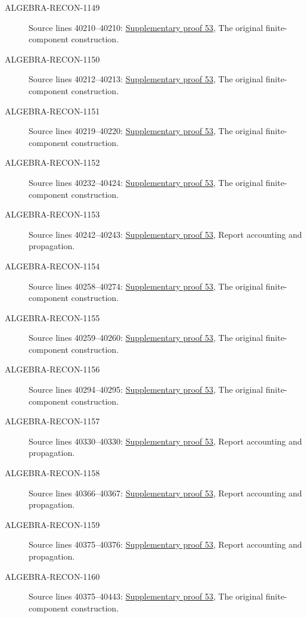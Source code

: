 \begin{description}
\item[ALGEBRA-RECON-1149] Source lines 40210--40210: \hyperlink{algebra_etale_quasifinite_notes_20260928}{Supplementary proof 53}, The original finite-component construction.
\item[ALGEBRA-RECON-1150] Source lines 40212--40213: \hyperlink{algebra_etale_quasifinite_notes_20260928}{Supplementary proof 53}, The original finite-component construction.
\item[ALGEBRA-RECON-1151] Source lines 40219--40220: \hyperlink{algebra_etale_quasifinite_notes_20260928}{Supplementary proof 53}, The original finite-component construction.
\item[ALGEBRA-RECON-1152] Source lines 40232--40424: \hyperlink{algebra_etale_quasifinite_notes_20260928}{Supplementary proof 53}, The original finite-component construction.
\item[ALGEBRA-RECON-1153] Source lines 40242--40243: \hyperlink{algebra_etale_quasifinite_notes_20260928}{Supplementary proof 53}, Report accounting and propagation.
\item[ALGEBRA-RECON-1154] Source lines 40258--40274: \hyperlink{algebra_etale_quasifinite_notes_20260928}{Supplementary proof 53}, The original finite-component construction.
\item[ALGEBRA-RECON-1155] Source lines 40259--40260: \hyperlink{algebra_etale_quasifinite_notes_20260928}{Supplementary proof 53}, The original finite-component construction.
\item[ALGEBRA-RECON-1156] Source lines 40294--40295: \hyperlink{algebra_etale_quasifinite_notes_20260928}{Supplementary proof 53}, The original finite-component construction.
\item[ALGEBRA-RECON-1157] Source lines 40330--40330: \hyperlink{algebra_etale_quasifinite_notes_20260928}{Supplementary proof 53}, Report accounting and propagation.
\item[ALGEBRA-RECON-1158] Source lines 40366--40367: \hyperlink{algebra_etale_quasifinite_notes_20260928}{Supplementary proof 53}, Report accounting and propagation.
\item[ALGEBRA-RECON-1159] Source lines 40375--40376: \hyperlink{algebra_etale_quasifinite_notes_20260928}{Supplementary proof 53}, Report accounting and propagation.
\item[ALGEBRA-RECON-1160] Source lines 40375--40443: \hyperlink{algebra_etale_quasifinite_notes_20260928}{Supplementary proof 53}, The original finite-component construction.

\end{description}

